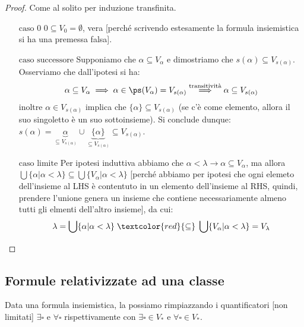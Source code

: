 \documentclass[11pt]{scrartcl}
\begin{document}
\begin{proof}
	Come al solito per induzione transfinita.
	\begin{itemize}
		\item[$\boxed{\text{caso $0$}}$] $0 \subseteq V_0 = \emptyset$, vera [perché scrivendo estesamente la formula insiemistica si ha una premessa falsa].
		\item[$\boxed{\text{caso successore}}$] Supponiamo che $\alpha \subseteq V_\alpha$ e dimostriamo che $s(\alpha) \subseteq V_{s(\alpha)}$. Osserviamo che dall'ipotesi si ha:
		\[ \alpha \subseteq V_\alpha \implies \alpha \in \ps(V_\alpha) = V_{s(\alpha)} \overset{\text{transitività}}{\implies} \alpha \subseteq V_{s(\alpha)}
			\]
		inoltre $\alpha \in V_{s(\alpha)}$ implica che $\{\alpha\} \subseteq V_{s(\alpha)}$ (se c'è come elemento, allora il suo singoletto è un suo sottoinsieme). Si conclude dunque: $s(\alpha) = \underbrace{\alpha}_{\subseteq V_{s(\alpha)}} \cup \underbrace{\{\alpha\}}_{\subseteq V_{s(\alpha)}} \subseteq V_{s(\alpha)}$.
		\item[$\boxed{\text{caso limite}}$] Per ipotesi induttiva abbiamo che $\alpha < \lambda \rightarrow \alpha \subseteq V_\alpha$, ma allora $\bigcup\{\alpha | \alpha < \lambda\} \subseteq \bigcup\{V_\alpha | \alpha < \lambda\}$ [perché abbiamo per ipotesi che ogni elemeto dell'insieme al LHS è contentuto in un elemento dell'insieme al RHS, 
		quindi, prendere l'unione genera un insieme che contiene necessariamente almeno tutti gli elmenti dell'altro insieme], da cui:
		\[ \lambda = \bigcup\{\alpha | \alpha < \lambda\} \;\textcolor{red}{\subseteq}\; \bigcup\{V_\alpha | \alpha < \lambda\} = V_\lambda
			\]
	\end{itemize}
\end{proof}

\subsection{Formule relativizzate ad una classe}

\begin{definition}[Relativizzazione a $V_*$]
	Data una formula insiemistica, la possiamo  rimpiazzando i quantificatori [non limitati] $\exists \square$ e $\forall \square$ rispettivamente con $\exists \square \in V_*$ e $\forall \square \in V_*$.
\end{definition}
\end{document}
